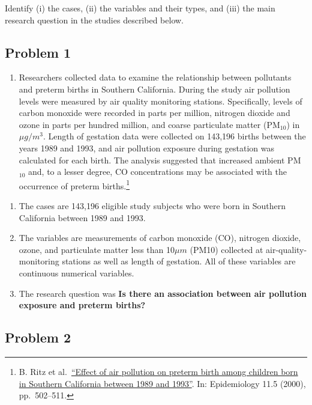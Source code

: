 \documentclass[
]{book}
\providecommand{\tightlist}{%
  \setlength{\itemsep}{0pt}\setlength{\parskip}{0pt}}
\begin{document}
Identify (i) the cases, (ii) the variables and their types, and (iii) the main research question in the studies described below.

\hypertarget{problem-1-1}{%
\subsection{Problem 1}\label{problem-1-1}}

\begin{enumerate}
\def\labelenumi{\arabic{enumi}.}
\tightlist
\item
  Researchers collected data to examine the relationship between pollutants and preterm births in Southern California. During the study air pollution levels were measured by air quality monitoring stations. Specifically, levels of carbon monoxide were recorded in parts per million, nitrogen dioxide and ozone in parts per hundred million, and coarse particulate matter (PM\(_{10}\)) in \(\mu g/m^3\). Length of gestation data were collected on 143,196 births between the years 1989 and 1993, and air pollution exposure during gestation was calculated for each birth. The analysis suggested that increased ambient PM\(_{10}\) and, to a lesser degree, CO concentrations may be associated with the occurrence of preterm births.\footnote{B. Ritz et al.~\href{http://journals.lww.com/epidem/Abstract/2000/09000/Effect_of_Air_Pollution_on_Preterm_Birth_Among.4.aspx}{``Effect of air pollution on preterm birth among children born in Southern California
    between 1989 and 1993''}. In: Epidemiology 11.5 (2000), pp.~502--511.}
\end{enumerate}

\begin{enumerate}
\def\labelenumi{\roman{enumi}.}
\item
  The cases are 143,196 eligible study subjects who were born in Southern California
  between 1989 and 1993.
\item
  The variables are measurements of carbon monoxide (CO), nitrogen dioxide, ozone, and particulate matter less than 10\(\mu m\) (PM10) collected at air-quality-monitoring stations as well as length of gestation. All of these variables are continuous numerical variables.
\item
  The research question was \textbf{Is there an association between air pollution exposure and preterm births?}
\end{enumerate}

\hypertarget{problem-2-1}{%
\subsection{Problem 2}\label{problem-2-1}}
\end{document}
